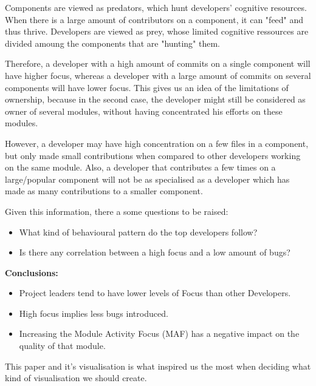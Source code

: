Components are viewed as predators, which hunt developers' cognitive resources. When there is a large amount of contributors on a component, it can "feed" and thus thrive.
Developers are viewed as prey, whose limited cognitive ressources are divided amoung the components that are "hunting" them.

Therefore, a developer with a high amount of commits on a single component will have higher focus, whereas a developer with a large amount of commits on several components will have lower focus.
This gives us an idea of the limitations of ownership, because in the second case, the developer might still be considered as owner of several modules, without having concentrated his efforts on these modules.

However, a developer may have high concentration on a few files in a component, but only made small contributions when compared to other developers working on the same module.
Also, a developer that contributes a few times on a large/popular component will not be as specialised as a developer which has made as many contributions to a smaller component.

Given this information, there a some questions to be raised:
\begin{itemize}
\item What kind of behavioural pattern do the top developers follow?
\item Is there any correlation between a high focus and a low amount of bugs?
\end{itemize}

\textbf{Conclusions:}
\begin{itemize}
\item Project leaders tend to have lower levels of Focus than other Developers.
\item High focus implies less bugs introduced.
\item Increasing the Module Activity Focus (MAF) has a negative impact on the quality of that module.
\end{itemize}

This paper and it's visualisation is what inspired us the most when deciding what kind of visualisation we should create.
